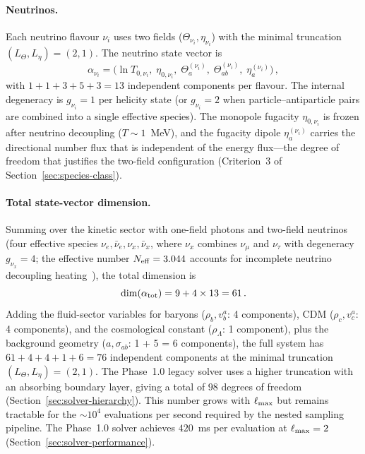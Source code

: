 \paragraph{Neutrinos.}

Each neutrino flavour $\nu_i$ uses two fields
($\Theta_{\nu_i}, \eta_{\nu_i}$) with the minimal
truncation $(L_\Theta, L_\eta) = (2, 1)$.  The
neutrino state vector is
\begin{equation}\label{eq:neutrino-state}
\alpha_{\nu_i}
= \big(
\ln T_{0,\nu_i},\;
\eta_{0,\nu_i},\;
\Theta^{(\nu_i)}_a,\;
\Theta^{(\nu_i)}_{ab},\;
\eta^{(\nu_i)}_a
\big)\,,
\end{equation}
with $1 + 1 + 3 + 5 + 3 = 13$ independent components
per flavour.  The internal degeneracy is $g_{\nu_i} = 1$
per helicity state (or $g_{\nu_i} = 2$ when
particle--antiparticle pairs are combined into a single
effective species).  The monopole fugacity $\eta_{0,\nu_i}$
is frozen after neutrino decoupling
($T \sim 1$~MeV), and the fugacity dipole
$\eta^{(\nu_i)}_a$ carries the directional number flux
that is independent of the energy flux---the degree of
freedom that justifies the two-field configuration
(Criterion~3 of Section~\ref{sec:species-class}).


\paragraph{Total state-vector dimension.}

Summing over the kinetic sector with one-field photons
and two-field neutrinos (four effective species
$\nu_e, \bar{\nu}_e, \nu_x, \bar{\nu}_x$, where
$\nu_x$ combines $\nu_\mu$ and $\nu_\tau$ with
degeneracy $g_{\nu_x} = 4$; the effective number
$N_{\rm eff} = 3.044$ accounts for incomplete
neutrino decoupling heating~\cite{Mangano2012}), the total
dimension is
\begin{equation}\label{eq:total-dof}
\dim(\alpha_{\rm tot})
= 9 + 4 \times 13 = 61\,.
\end{equation}
Adding the fluid-sector variables for baryons
($\rho_b, v_b^a$: 4 components), CDM
($\rho_c, v_c^a$: 4 components), and the cosmological
constant ($\rho_\Lambda$: 1 component), plus the
background geometry ($a, \sigma_{ab}$: 1 + 5 = 6
components), the full system has
$61 + 4 + 4 + 1 + 6 = 76$ independent components at
the minimal truncation $(L_\Theta, L_\eta) = (2, 1)$.
The Phase~1.0 legacy solver uses a higher truncation
with an absorbing boundary layer, giving a total of $98$
degrees of freedom
(Section~\ref{sec:solver-hierarchy}).  This number grows with
$\ell_{\rm max}$ but remains tractable for the
$\sim\!10^4$ evaluations per second required by the
nested sampling pipeline.  The Phase~1.0 solver
achieves $420$~ms per evaluation at
$\ell_{\rm max} = 2$
(Section~\ref{sec:solver-performance}).


